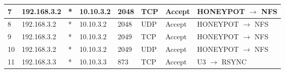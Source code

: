 \documentclass[a4paper, 11pt, oneside]{article}
\begin{document}
\begin{table}[H]
{\begin{tabular}{|llllllll|}
\multicolumn{1}{|l|}{7}           & \multicolumn{1}{l|}{192.168.3.2}                                                  & \multicolumn{1}{l|}{*}                                                              & \multicolumn{1}{l|}{10.10.3.2}                                                        & \multicolumn{1}{l|}{2048}                                                                & \multicolumn{1}{l|}{TCP}               & \multicolumn{1}{l|}{Accept}          & HONEYPOT $\rightarrow$ NFS             \\ \hline
\multicolumn{1}{|l|}{8}           & \multicolumn{1}{l|}{192.168.3.2}                                                  & \multicolumn{1}{l|}{*}                                                              & \multicolumn{1}{l|}{10.10.3.2}                                                        & \multicolumn{1}{l|}{2048}                                                                & \multicolumn{1}{l|}{UDP}               & \multicolumn{1}{l|}{Accept}          & HONEYPOT $\rightarrow$ NFS             \\ \hline
\multicolumn{1}{|l|}{9}           & \multicolumn{1}{l|}{192.168.3.2}                                                  & \multicolumn{1}{l|}{*}                                                              & \multicolumn{1}{l|}{10.10.3.2}                                                        & \multicolumn{1}{l|}{2049}                                                                & \multicolumn{1}{l|}{TCP}               & \multicolumn{1}{l|}{Accept}          & HONEYPOT $\rightarrow$ NFS             \\ \hline
\multicolumn{1}{|l|}{10}          & \multicolumn{1}{l|}{192.168.3.2}                                                  & \multicolumn{1}{l|}{*}                                                              & \multicolumn{1}{l|}{10.10.3.2}                                                        & \multicolumn{1}{l|}{2049}                                                                & \multicolumn{1}{l|}{UDP}               & \multicolumn{1}{l|}{Accept}          & HONEYPOT $\rightarrow$ NFS             \\ \hline
\multicolumn{1}{|l|}{11}          & \multicolumn{1}{l|}{192.168.3.3}                                                  & \multicolumn{1}{l|}{*}                                                              & \multicolumn{1}{l|}{10.10.3.3}                                                         & \multicolumn{1}{l|}{873}                                                                 & \multicolumn{1}{l|}{TCP}               & \multicolumn{1}{l|}{Accept}          & U3 $\rightarrow$ RSYNC                 \\ \hline

\end{tabular}}
\end{table}
\end{document}
